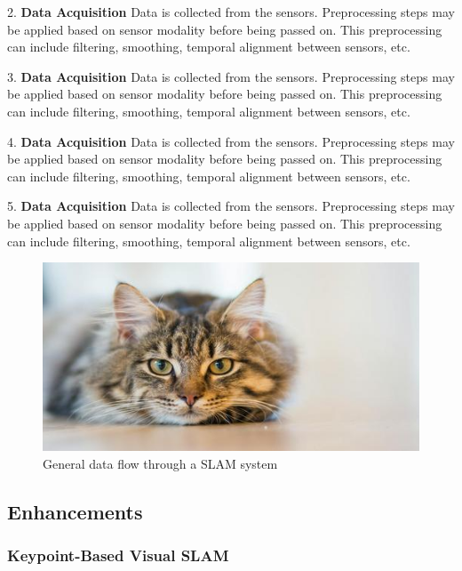 2. \textbf{Data Acquisition}\newline
Data is collected from the sensors. Preprocessing steps may be applied based on sensor modality before being passed on. This preprocessing can include filtering, smoothing, temporal alignment between sensors, etc.

3. \textbf{Data Acquisition}\newline
Data is collected from the sensors. Preprocessing steps may be applied based on sensor modality before being passed on. This preprocessing can include filtering, smoothing, temporal alignment between sensors, etc.

4. \textbf{Data Acquisition}\newline
Data is collected from the sensors. Preprocessing steps may be applied based on sensor modality before being passed on. This preprocessing can include filtering, smoothing, temporal alignment between sensors, etc.

5. \textbf{Data Acquisition}\newline
Data is collected from the sensors. Preprocessing steps may be applied based on sensor modality before being passed on. This preprocessing can include filtering, smoothing, temporal alignment between sensors, etc.

\begin{figure}[h!]
    \includegraphics[width=\textwidth]{resources/placeholder.jpeg}
    \caption{General data flow through a SLAM system}
    \label{fig:general_slam_pipeline}
\end{figure}

\subsection{Enhancements}

\subsubsection{Keypoint-Based Visual SLAM}

